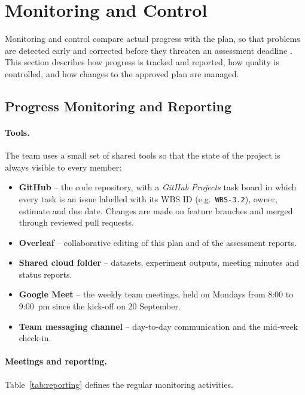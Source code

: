 \section{Monitoring and Control}\label{sec:monitoring}

Monitoring and control compare actual progress with the plan, so that problems are detected early and corrected before they threaten an assessment deadline \parencite{pmi2021pmbok}. This section describes how progress is tracked and reported, how quality is controlled, and how changes to the approved plan are managed.

\subsection{Progress Monitoring and Reporting}\label{sec:progress}

\paragraph{Tools.} The team uses a small set of shared tools so that the state of the project is always visible to every member:

\begin{itemize}[nosep]
  \item \textbf{GitHub} -- the code repository, with a \emph{GitHub Projects} task board in which every task is an issue labelled with its WBS ID (e.g.\ \texttt{WBS-3.2}), owner, estimate and due date. Changes are made on feature branches and merged through reviewed pull requests.
  \item \textbf{Overleaf} -- collaborative editing of this plan and of the assessment reports.
  \item \textbf{Shared cloud folder} -- datasets, experiment outputs, meeting minutes and status reports.
  \item \textbf{Google Meet} -- the weekly team meetings, held on Mondays from 8:00 to 9:00~pm since the kick-off on 20 September.
  \item \textbf{Team messaging channel} -- day-to-day communication and the mid-week check-in.
\end{itemize}

\paragraph{Meetings and reporting.} Table~\ref{tab:reporting} defines the regular monitoring activities.

